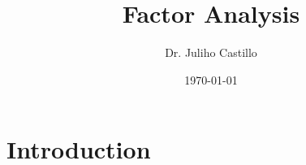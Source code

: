 \documentclass[aspectratio=169]{beamer}
\title{Factor Analysis}
\author{Dr. Juliho Castillo}
\institute{Tecnológico de Monterrey}
\date{\today}
\begin{document}
\begin{frame}
    \titlepage
\end{frame}

\begin{frame}
    \tableofcontents
\end{frame}


\section{Introduction}

\begin{frame}
    
\end{frame}
\end{document}
